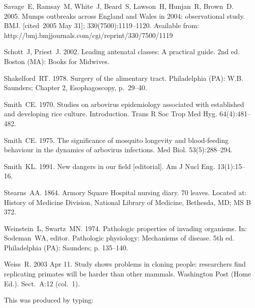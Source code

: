 \documentclass[]{interact}
\theoremstyle{plain}%
\theoremstyle{definition}
\theoremstyle{remark}
\begin{document}
\begin{thebibliography}{}
Savage~E, Ramsay~M, White~J, Beard~S, Lawson~H, Hunjan~R, Brown~D. 2005. Mumps
  outbreaks across England and Wales in 2004: observational study. BMJ.
  [cited~2005 May 31]; 330(7500):1119--1120. Available from:
  http://bmj.bmjjournals.com/cgi/reprint/330/7500/1119

Schott~J, Priest~J. 2002. Leading antenatal classes: A practical guide. 2nd ed.
  Boston (MA): Books for Midwives.

Shakelford~RT. 1978. Surgery of the alimentary tract. Philadelphia (PA): W.B.
  Saunders; Chapter 2, Esophagoscopy, p.~29--40.

Smith~CE. 1970. Studies on arbovirus epidemiology associated with established
  and developing rice culture. Introduction. Trans R Soc Trop Med Hyg.
  64(4):481--482.

Smith~CE. 1975. The significance of mosquito longevity and blood-feeding
  behaviour in the dynamics of arbovirus infections. Med Biol. 53(5):288--294.

Smith~KL. 1991. New dangers in our field [editorial]. Am J Nucl Eng.
  13(1):15--16.

Stearns~AA. 1864. Armory {S}quare {H}ospital nursing diary. 70 leaves. Located
  at: History of Medicine Division, National Library of Medicine, Bethesda, MD;
  MS B 372.

Weinstein~L, Swartz~MN. 1974. Pathologic properties of invading organisms. In:
  Sodeman~WA, editor. Pathologic physiology: Mechanisms of disease. 5th ed.
  Philadelphia (PA): Saunders; p. 135--140.

Weiss~R. 2003 Apr 11. Study shows problems in cloning people: researchers find
  replicating primates will be harder than other mammals. Washington Post (Home
  Ed.). Sect.~A:12 (col.~1).

\end{thebibliography}
\bigskip
\noindent This was produced by typing:
\end{document}
